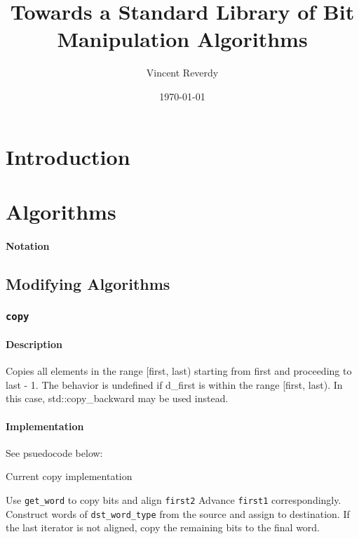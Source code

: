 \documentclass[letterpaper, 8pt, twocolumn]{article}
\title{Towards a Standard Library of Bit Manipulation Algorithms}
\author{%
Vincent Reverdy%
}
\date{\today}
\begin{document}
\maketitle
\begin{abstract}
\label{sec:abstract}
\end{abstract}
\section{Introduction}
\label{sec:introduction}
\section{Algorithms}
\label{sec:algorithms}

\paragraph{Notation}


\subsection{Modifying Algorithms}
\label{subsec:modifyingAlgs}

\subsubsection{\texttt{copy}}
\label{subsubsec:copy}
\paragraph{Description}
Copies all elements in the range [first, last) starting from first and 
proceeding to last - 1. The behavior is undefined if d\_first is within the 
range [first, last). In this case, std::copy\_backward may be used instead.

\paragraph{Implementation}
See psuedocode below:
\begin{algorithm}[H]
    \caption{Current copy implementation}
    \begin{algorithmic}[1]
            \State Use \texttt{get\_word} to copy bits and align \texttt{first2}
            \State Advance \texttt{first1} correspondingly.
        \EndIf
            \State Construct words of \texttt{dst\_word\_type}
            from the source and assign to destination.
        \EndWhile
        \State If the last iterator is not aligned, copy the remaining bits to the
            final word.
        \EndFunction
    \end{algorithmic}
\end{algorithm}
\end{document}
